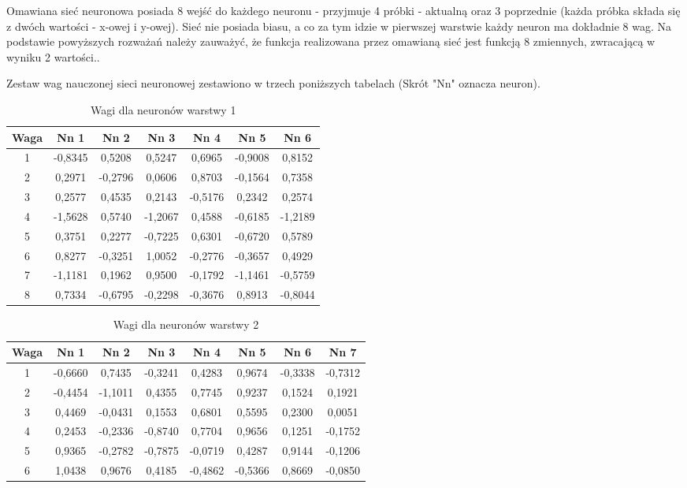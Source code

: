 \documentclass{classrep}
\begin{document}
Omawiana sieć neuronowa posiada 8 wejść do każdego neuronu - przyjmuje 4 próbki - aktualną oraz 3 poprzednie (każda próbka składa się z dwóch wartości - x-owej i y-owej). Sieć nie posiada biasu, a co za tym idzie w pierwszej warstwie każdy neuron ma  dokładnie 8 wag. Na podstawie powyższych rozważań należy zauważyć, że funkcja realizowana przez omawianą sieć jest funkcją 8 zmiennych, zwracającą w wyniku 2 wartości.\newline.

Zestaw wag nauczonej sieci neuronowej zestawiono w trzech poniższych tabelach (Skrót "Nn" oznacza neuron). 

\begin{table}[H]
	\centering
	\begin{tabular}{c c c c c c c} 
		\hline
		\textbf{Waga} & \textbf{Nn 1} & \textbf{Nn 2} & \textbf{Nn 3} & \textbf{Nn 4} & \textbf{Nn 5} & \textbf{Nn 6}\\ [0.5ex] 
		\hline
		\hline 
1	&	-0,8345	&	0,5208	&	0,5247	&	0,6965	&	-0,9008	&	0,8152	\\
2	&	0,2971	&	-0,2796	&	0,0606	&	0,8703	&	-0,1564	&	0,7358	\\
3	&	0,2577	&	0,4535	&	0,2143	&	-0,5176	&	0,2342	&	0,2574	\\
4	&	-1,5628	&	0,5740	&	-1,2067	&	0,4588	&	-0,6185	&	-1,2189	\\
5	&	0,3751	&	0,2277	&	-0,7225	&	0,6301	&	-0,6720	&	0,5789	\\
6	&	0,8277	&	-0,3251	&	1,0052	&	-0,2776	&	-0,3657	&	0,4929	\\
7	&	-1,1181	&	0,1962	&	0,9500	&	-0,1792	&	-1,1461	&	-0,5759	\\
8	&	0,7334	&	-0,6795	&	-0,2298	&	-0,3676	&	0,8913	&	-0,8044	\\
		\hline
	\end{tabular}
	\caption{Wagi dla neuronów warstwy 1}
\end{table}

\begin{table}[H]
	\centering
	\begin{tabular}{c c c c c c c c} 
		\hline
		\textbf{Waga} & \textbf{Nn 1} & \textbf{Nn 2} & \textbf{Nn 3} & \textbf{Nn 4} & \textbf{Nn 5} & \textbf{Nn 6} & \textbf{Nn 7}\\ [0.5ex] 
		\hline
		\hline 
1	&	-0,6660	&	0,7435	&	-0,3241	&	0,4283	&	0,9674	&	-0,3338	&	-0,7312	\\
2	&	-0,4454	&	-1,1011	&	0,4355	&	0,7745	&	0,9237	&	0,1524	&	0,1921	\\
3	&	0,4469	&	-0,0431	&	0,1553	&	0,6801	&	0,5595	&	0,2300	&	0,0051	\\
4	&	0,2453	&	-0,2336	&	-0,8740	&	0,7704	&	0,9656	&	0,1251	&	-0,1752	\\
5	&	0,9365	&	-0,2782	&	-0,7875	&	-0,0719	&	0,4287	&	0,9144	&	-0,1206	\\
6	&	1,0438	&	0,9676	&	0,4185	&	-0,4862	&	-0,5366	&	0,8669	&	-0,0850	\\
		\hline
	\end{tabular}
	\caption{Wagi dla neuronów warstwy 2}
\end{table}
\end{document}
